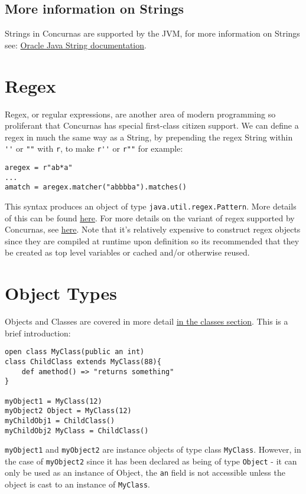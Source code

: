 \documentclass[conc-doc]{subfiles}
\begin{document}
\subsection{More information on Strings}
Strings in Concurnas are supported by the JVM, for more information on Strings see: \href{https://docs.oracle.com/javase/tutorial/java/data/strings.html}{Oracle Java String documentation}.

\section{Regex}
Regex, or regular expressions, are another area of modern programming so proliferant that Concurnas has special first-class citizen support. We can define a regex in much the same way as a String, by prepending the regex String within \lstinline{''} or \lstinline{""} with \lstinline{r}, to make \lstinline{r''} or \lstinline{r""} for example:
\begin{lstlisting}
aregex = r"ab*a"
...
amatch = aregex.matcher("abbbba").matches()
\end{lstlisting}

This syntax produces an object of type \lstinline{java.util.regex.Pattern}. More details of this can be found \href{https://docs.oracle.com/en/java/javase/12/docs/api/java.base/java/util/regex/Pattern.html}{here}. For more details on the variant of regex supported by Concurnas, see \href{https://docs.oracle.com/en/java/javase/12/docs/api/java.base/java/util/regex/Pattern.html}{here}. Note that it's relatively expensive to construct regex objects since they are compiled at runtime upon definition so its recommended that they be created as top level variables or cached and/or otherwise reused.

\section{Object Types}
Objects and Classes are covered in more detail \hyperref[ch:classes]{in the classes section}. This is a brief introduction:

\begin{lstlisting}
open class MyClass(public an int)
class ChildClass extends MyClass(88){
	def amethod() => "returns something"
}

myObject1 = MyClass(12)
myObject2 Object = MyClass(12)
myChildObj1 = ChildClass()
myChildObj2 MyClass = ChildClass()
\end{lstlisting}

\lstinline{myObject1} and \lstinline{myObject2} are instance objects of type class \lstinline{MyClass}. However, in the case of \lstinline{myObject2} since it has been declared as being of type \lstinline{Object} - it can only be used as an instance of Object, the \lstinline{an} field is not accessible unless the object is cast to an instance of \lstinline{MyClass}.
\end{document}
